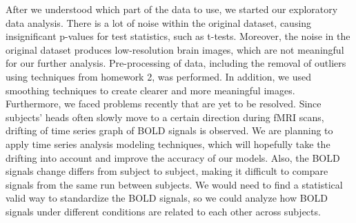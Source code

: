 \documentclass[11pt,twocolumn]{article}
\begin{document}
After we understood which part of the data to use, we started our 
exploratory data analysis. There is a lot of noise within the original dataset, 
causing insignificant p-values for test statistics, such as t-tests. Moreover, 
the noise in the original dataset produces low-resolution brain images, 
which are not meaningful for our further analysis. Pre-processing of data, 
including the removal of outliers using techniques from homework 2, was 
performed. In addition, we used smoothing techniques to create clearer 
and more meaningful images. \\

Furthermore, we faced problems recently that are yet to be resolved. Since 
subjects' heads often slowly move to a certain direction during fMRI scans, 
drifting of time series graph of BOLD signals is observed. We are planning 
to apply time series analysis modeling techniques, which will hopefully take 
the drifting into account and improve the accuracy of our models. Also, the 
BOLD signals change differs from subject to subject, making it difficult to 
compare signals from the same run between subjects. We would need to 
find a statistical valid way to standardize the BOLD signals, so we could 
analyze how BOLD signals under different conditions are related to each 
other across subjects. \\






\end{document}
